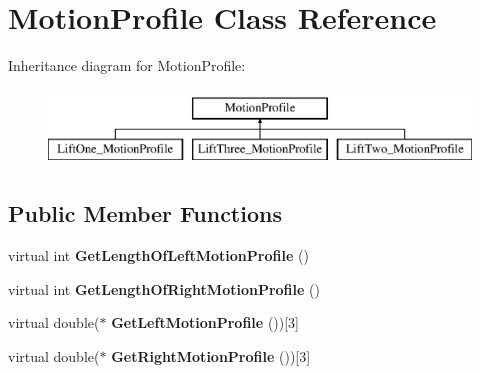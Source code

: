 \hypertarget{class_motion_profile}{}\section{Motion\+Profile Class Reference}
\label{class_motion_profile}
Inheritance diagram for Motion\+Profile\+:\begin{figure}[H]
\begin{center}
\leavevmode
\includegraphics[height=2.000000cm]{class_motion_profile}
\end{center}
\end{figure}
\subsection*{Public Member Functions}
\begin{DoxyCompactItemize}
\item 
\mbox{\label{class_motion_profile_a9639c4bb07b29bd3aa95023164387ee4}} 
virtual int {\bfseries Get\+Length\+Of\+Left\+Motion\+Profile} ()
\item 
\mbox{\label{class_motion_profile_ac7e7b2097e4b4f12b4d065db530f26d2}} 
virtual int {\bfseries Get\+Length\+Of\+Right\+Motion\+Profile} ()
\item 
\mbox{\label{class_motion_profile_a7758fb7971a13c098b019a5f05bf6dda}} 
virtual double($\ast$ {\bfseries Get\+Left\+Motion\+Profile} ())\mbox{[}3\mbox{]}
\item 
\mbox{\label{class_motion_profile_a9260edbeabd693944002363dbe337bed}} 
virtual double($\ast$ {\bfseries Get\+Right\+Motion\+Profile} ())\mbox{[}3\mbox{]}
\end{DoxyCompactItemize}
